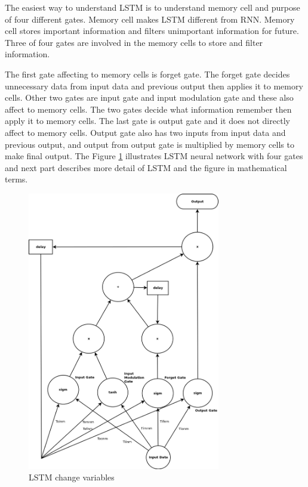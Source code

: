 \documentclass[draft,dvipsnames]{drexel-thesis}
\begin{document}
\begin{thesis}
\begin{enumerate}
\begin{enumerate}
		The easiest way to understand LSTM is to understand memory cell and purpose of four different gates. Memory cell makes LSTM different from RNN. Memory cell stores important information and filters unimportant information for future. Three of four gates are involved in the memory cells to store and filter information.
		
		The first gate affecting to memory cells is forget gate. The forget gate decides unnecessary data from input data and previous output then applies it to memory cells. Other two gates are input gate and input modulation gate and these also affect to memory cells. The two gates decide what information remember then apply it to memory cells. The last gate is output gate and it does not directly affect to memory cells. Output gate also has two inputs from input data and previous output, and output from output gate is multiplied by memory cells to make final output. The Figure \ref{fig:LSTM} illustrates LSTM neural network with four gates and next part describes more detail of LSTM and the figure in mathematical terms.

\begin{figure}[t!]
    \centering
    \includegraphics[width=0.75\textwidth]{pictures/figures/LSTM.png}
    \caption{LSTM {\color{red} change variables}}
    \label{fig:LSTM}
\end{figure}
		

\end{enumerate}
\end{enumerate}
\end{thesis}
\end{document}
